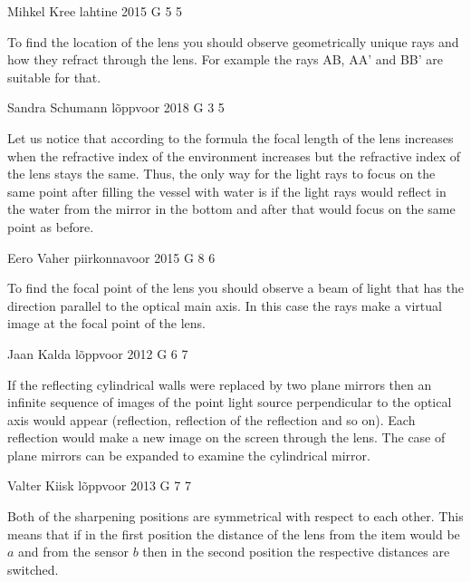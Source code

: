\documentclass[11pt]{article}
\begin{document}
{Mihkel Kree} %
{lahtine} %
{2015} %
{G 5} %
{5} %
{

\ifEngHint
To find the location of the lens you should observe geometrically unique rays and how they refract through the lens. For example the rays AB, AA’ and BB’ are suitable for that.
\fi
}

{Sandra Schumann} %
{lõppvoor} %
{2018} %
{G 3} %
{5} %
{

\ifEngHint
Let us notice that according to the formula the focal length of the lens increases when the refractive index of the environment increases but the refractive index of the lens stays the same. Thus, the only way for the light rays to focus on the same point after filling the vessel with water is if the light rays would reflect in the water from the mirror in the bottom and after that would focus on the same point as before.
\fi
}

{Eero Vaher} %
{piirkonnavoor} %
{2015} %
{G 8} %
{6} %
{

\ifEngHint
To find the focal point of the lens you should observe a beam of light that has the direction parallel to the optical main axis. In this case the rays make a virtual image at the focal point of the lens.
\fi
}

{Jaan Kalda} %
{lõppvoor} %
{2012} %
{G 6} %
{7} %
{

\ifEngHint
If the reflecting cylindrical walls were replaced by two plane mirrors then an infinite sequence of images of the point light source perpendicular to the optical axis would appear (reflection, reflection of the reflection and so on). Each reflection would make a new image on the screen through the lens. The case of plane mirrors can be expanded to examine the cylindrical mirror.
\fi
}

{Valter Kiisk} %
{lõppvoor} %
{2013} %
{G 7} %
{7} %
{

\ifEngHint
Both of the sharpening positions are symmetrical with respect to each other. This means that if in the first position the distance of the lens from the item would be $a$ and from the sensor $b$ then in the second position the respective distances are switched.
\fi
}
\end{document}
